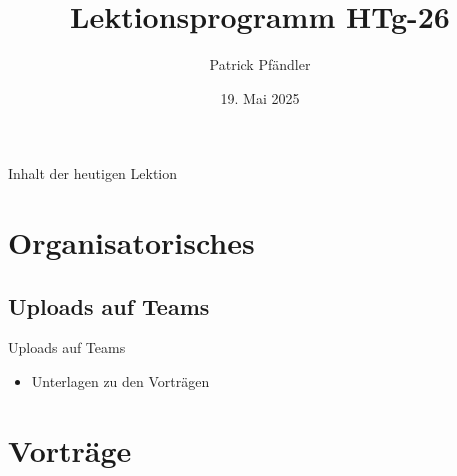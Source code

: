



\title{\textbf{Lektionsprogramm HTg-26}}
\author{Patrick Pfändler}
\date{19. Mai   2025}




\frame{\titlepage}


\folieFragen



\begin{frame}{Inhalt der heutigen Lektion}
    \tableofcontents
\end{frame}


\section{Organisatorisches}
\BlueSectionSlide

\subsection{Uploads auf Teams}
\begin{frame}{Uploads auf Teams}
    \begin{itemize}
        \item[\textbullet] Unterlagen zu den Vorträgen
    \end{itemize}

\end{frame}

\section{Vorträge}
\BlueSectionSlide

